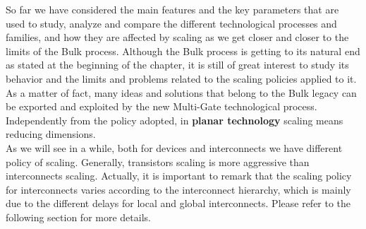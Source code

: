 \documentclass[a4paper, 12pt, twoside, openright]{report}
\begin{document}
So far we have considered the main features and the key parameters that are used to study, analyze and compare the different technological processes and families, and how they are affected by scaling as we get closer and closer to the limits of the Bulk process. Although the Bulk process is getting to its natural end as stated at the beginning of the chapter, it is still of great interest to study its behavior and the limits and problems related to the scaling policies applied to it. As a matter of fact, many ideas and solutions that belong to the Bulk legacy can be exported and exploited by the new Multi-Gate technological process. Independently from the policy adopted, in \textbf{planar technology} scaling means reducing dimensions.\\
As we will see in a while, both for devices and interconnects we have different policy of scaling. Generally, transistors scaling is more aggressive than interconnects scaling. Actually, it is important to remark that the scaling policy for interconnects varies according to the interconnect hierarchy, which is mainly due to the different delays for local and global interconnects. Please refer to the following section for more details.

%
%


\end{document}

